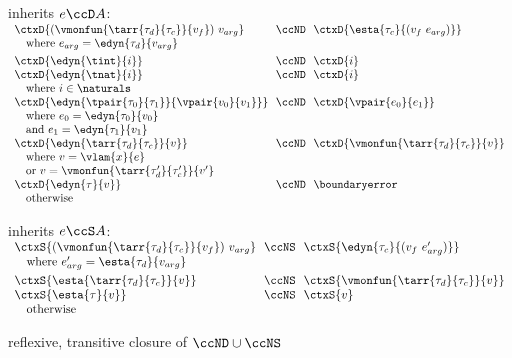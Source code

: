 \begin{flushleft}
\medskip
\begin{minipage}[t]{\columnwidth}
 inherits $e \ccD A$:\\
$\begin{array}{l@{~~}c@{~~}l}
  \ctxD{(\vmonfun{\tarr{\tau_d}{\tau_c}}{v_f})~v_{arg}} & \ccND & \ctxD{\esta{\tau_c}{(v_f~e_{arg})}}
\\ \multicolumn{3}{l}{\mbox{\quad where $e_{arg} = \edyn{\tau_d}{v_{arg}}$}}
\\[0.8ex]
  \ctxD{\edyn{\tint}{i}} & \ccND & \ctxD{i}
\\
  \ctxD{\edyn{\tnat}{i}} & \ccND & \ctxD{i}
\\ \multicolumn{3}{l}{\mbox{\quad where $i \in \naturals$}}
\\
  \ctxD{\edyn{\tpair{\tau_0}{\tau_1}}{\vpair{v_0}{v_1}}} & \ccND & \ctxD{\vpair{e_0}{e_1}}
\\ \multicolumn{3}{l}{\mbox{\quad where $e_0 = \edyn{\tau_0}{v_0}$}}
\\ \multicolumn{3}{l}{\mbox{\quad and $e_1 = \edyn{\tau_1}{v_1}$}}
\\
  \ctxD{\edyn{\tarr{\tau_d}{\tau_c}}{v}} & \ccND & \ctxD{\vmonfun{\tarr{\tau_d}{\tau_c}}{v}}
\\ \multicolumn{3}{l}{\mbox{\quad where $v = \vlam{x}{e}$}}
\\ \multicolumn{3}{l}{\mbox{\quad or $v = \vmonfun{\tarr{\tau_d'}{\tau_c'}}{v'}$}}
\\
  \ctxD{\edyn{\tau}{v}} & \ccND & \boundaryerror
\\ \multicolumn{3}{l}{\mbox{\quad otherwise}}
\end{array}$
\end{minipage}%
\begin{minipage}[t]{\columnwidth}
 inherits $e \ccS A$:\\
$\begin{array}{l@{~~}c@{~~}l}
  \ctxS{(\vmonfun{\tarr{\tau_d}{\tau_c}}{v_f})~v_{arg}} & \ccNS & \ctxS{\edyn{\tau_c}{(v_f~e_{arg}')}}
\\ \multicolumn{3}{l}{\mbox{\quad where $e_{arg}' = \esta{\tau_d}{v_{arg}}$}}
\\[0.8ex]
  \ctxS{\esta{\tarr{\tau_d}{\tau_c}}{v}} & \ccNS & \ctxS{\vmonfun{\tarr{\tau_d}{\tau_c}}{v}}
\\
  \ctxS{\esta{\tau}{v}} & \ccNS & \ctxS{v}
\\ \multicolumn{3}{l}{\mbox{\quad otherwise}}
\end{array}$

\vspace{7em}

 reflexive, transitive closure of $\ccND \cup \ccNS$
\end{minipage}

\end{flushleft}
